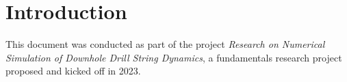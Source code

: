 \chapter{Introduction}
This document was conducted as part of the project \emph{Research on Numerical Simulation of Downhole Drill String Dynamics}, a fundamentals research project proposed and kicked off in 2023.
